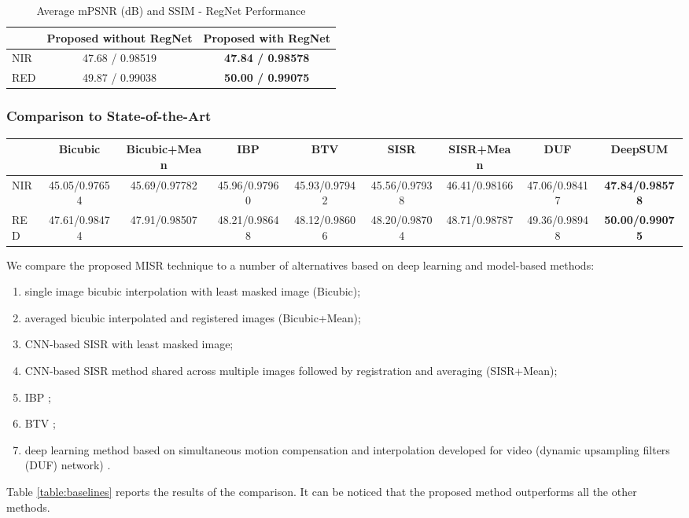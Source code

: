 \documentclass[journal]{IEEEtran}
\begin{document}
\begin{table}[t]
\centering
\caption{Average mPSNR (dB) and SSIM - RegNet Performance}
\label{table:noregnet}
\begin{tabular}{lcc}
 & Proposed without RegNet & \textbf{Proposed with RegNet} \\ \hline
NIR & 47.68 / 0.98519 & \textbf{47.84 / 0.98578} \\ \hline
RED & 49.87 / 0.99038 & \textbf{50.00 / 0.99075} \\ \hline
\end{tabular}
\end{table}

\subsubsection{Comparison to State-of-the-Art}

\begin{table*}[t]
\centering
\caption{Average mPSNR (db) and SSIM}
\label{table:baselines}
\begin{tabular}{lcccccccc}
 & Bicubic & Bicubic+Mean & IBP \cite{IRANI1991231} & BTV \cite{1331445} & SISR & SISR+Mean & DUF \cite{Jo_2018_CVPR} & \textbf{DeepSUM} \\ \hline
NIR & 45.05/0.97654 & 45.69/0.97782 & 45.96/0.97960 & 45.93/0.97942 & 45.56/0.97938 & 46.41/0.98166 & 47.06/0.98417 & \textbf{47.84/0.98578} \\ \hline
RED & 47.61/0.98474 & 47.91/0.98507 & 48.21/0.98648 & 48.12/0.98606 & 48.20/0.98704 & 48.71/0.98787 & 49.36/0.98948 & \textbf{50.00/0.99075} \\ \hline
\end{tabular}
\end{table*}

We compare the proposed MISR technique to a number of alternatives based on deep learning and model-based methods:
\begin{enumerate}
    \item single image bicubic interpolation with least masked image (Bicubic);
    \item averaged bicubic interpolated and registered images (Bicubic+Mean);
    \item CNN-based SISR with least masked image;
    \item CNN-based SISR method shared across multiple images followed by registration and averaging (SISR+Mean);
    \item IBP \cite{IRANI1991231};
    \item BTV \cite{1331445};
    \item deep  learning  method  based  on  simultaneous motion compensation and interpolation developed for video (dynamic upsampling filters (DUF) network) \cite{Jo_2018_CVPR}.
\end{enumerate}
Table \ref{table:baselines} reports the results of the comparison. It can be noticed that the proposed method outperforms all the other methods.
\end{document}
